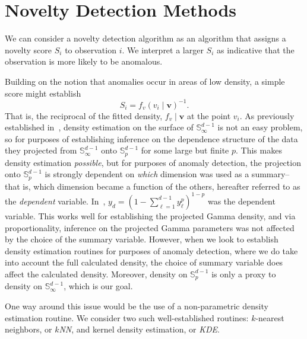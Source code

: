 \section{Novelty Detection Methods}
We can consider a novelty detection algorithm as an algorithm that assigns a
  novelty score $S_i$ to observation $i$.  We interpret a larger $S_i$ 
  as indicative that the observation is more likely to be anomalous.

Building on the notion that anomalies occur in areas of low density, a simple
  score might establish
  \[
      S_i = f_v(v_i\mid \bm{v})^{-1}.  
  \]
  That is, the reciprocal of the fitted density, $f_v\mid \bm{v}$ at the point $v_i$.
  As previously established in~\cite{trubey:pg}, density estimation on the 
  surface of ${\mathbb S}_{\infty}^{d-1}$ is not an easy problem, so for 
  purposes of establishing inference on the dependence structure of the data 
  they projected from ${\mathbb S}_{\infty}^{d-1}$ onto ${\mathbb S}_p^{d-1}$ for 
  some large but finite $p$.  This makes density estimation \emph{possible}, but 
  for purposes of anomaly detection, the projection onto ${\mathbb S}_p^{d-1}$ is 
  strongly dependent on \emph{which} dimension was used as a summary--that is, 
  which dimension became a function of the others, hereafter referred to as the 
  \emph{dependent} variable. In~\cite{trubey:pg}, 
  $y_d = (1 - \sum_{\ell = 1}^{d-1}y_{\ell}^p)^{1-p}$ was the dependent variable.
  This works well for establishing the projected Gamma density, and via 
  proportionality, inference on the projected Gamma parameters was not affected
  by the choice of the summary variable. However, when we look to establish 
  density estimation routines for purposes of anomaly detection, where we do 
  take into account the full calculated density, the choice of summary variable 
  does affect the calculated density.  Moreover, density on $\mathbb{S}_p^{d-1}$
  is only a proxy to density on $\mathbb{S}_{\infty}^{d-1}$, which is our goal.

One way around this issue would be the use of a non-parametric density estimation
  routine.  We consider two such well-established routines: $k$-nearest neighbors, 
  or \emph{$k$NN}, and kernel density estimation, or \emph{KDE}.

